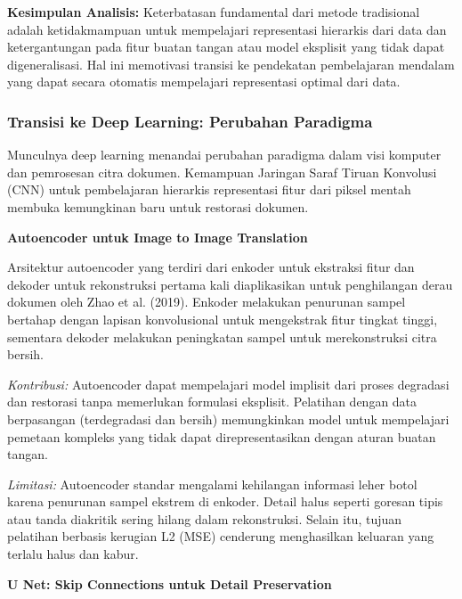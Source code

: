 \documentclass[12pt,a4paper]{article}
\begin{document}
\textbf{Kesimpulan Analisis:} Keterbatasan fundamental dari metode tradisional adalah ketidakmampuan untuk mempelajari representasi hierarkis dari data dan ketergantungan pada fitur buatan tangan atau model eksplisit yang tidak dapat digeneralisasi. Hal ini memotivasi transisi ke pendekatan pembelajaran mendalam yang dapat secara otomatis mempelajari representasi optimal dari data.

\subsubsection{Transisi ke Deep Learning: Perubahan Paradigma}
\label{subsubsec:transisi-deep-learning}

\vspace{1.5ex}

Munculnya deep learning menandai perubahan paradigma dalam visi komputer dan pemrosesan citra dokumen. Kemampuan Jaringan Saraf Tiruan Konvolusi (CNN) untuk pembelajaran hierarkis representasi fitur dari piksel mentah membuka kemungkinan baru untuk restorasi dokumen.

\textbf{Autoencoder untuk Image to Image Translation}

Arsitektur autoencoder yang terdiri dari enkoder untuk ekstraksi fitur dan dekoder untuk rekonstruksi pertama kali diaplikasikan untuk penghilangan derau dokumen oleh Zhao et al. (2019). Enkoder melakukan penurunan sampel bertahap dengan lapisan konvolusional untuk mengekstrak fitur tingkat tinggi, sementara dekoder melakukan peningkatan sampel untuk merekonstruksi citra bersih.

\textit{Kontribusi:} Autoencoder dapat mempelajari model implisit dari proses degradasi dan restorasi tanpa memerlukan formulasi eksplisit. Pelatihan dengan data berpasangan (terdegradasi dan bersih) memungkinkan model untuk mempelajari pemetaan kompleks yang tidak dapat direpresentasikan dengan aturan buatan tangan.

\textit{Limitasi:} Autoencoder standar mengalami kehilangan informasi leher botol karena penurunan sampel ekstrem di enkoder. Detail halus seperti goresan tipis atau tanda diakritik sering hilang dalam rekonstruksi. Selain itu, tujuan pelatihan berbasis kerugian L2 (MSE) cenderung menghasilkan keluaran yang terlalu halus dan kabur.

\textbf{U Net: Skip Connections untuk Detail Preservation}
\end{document}
